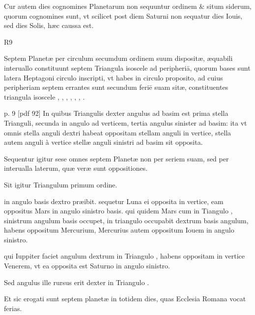 Cur autem dies cognomines Planetarum non sequuntur ordinem \&
situm siderum, quorum cognomines sunt, vt scilicet post diem Saturni
non sequatur dies Iouis, sed dies Solis, hæc caussa est.

\begin{wrapfigure}[9]{R}{9\baselineskip}
  \centering
  \def\svgwidth{9\baselineskip}
  {\astrofont}
\end{wrapfigure}

Septem Planetæ
per circulum secumdum ordinem suum
dispositæ, æquabili interuallo constituunt septem
Triangula isoscele ad peripheriā,  quorum
bases sunt latera Heptagoni circulo inscripti,
vt habes in circulo proposito, ad cuius
peripheriam septem errantes sunt secundum
feriē suam sitæ, constituentes triangula
isoscele , , ,
 , , , .

%

p. 9 [pdf 92]
%
In quibus Triangulis dexter angulus ad basim
est prima stella Trianguli, secunda in angulo ad verticem, tertia angulus
sinister ad basim: ita vt omnis stella anguli dextri habeat oppositam
stellam anguli in vertice, stella autem anguli à vertice stellæ
anguli sinistri ad basim sit opposita.

Sequentur igitur sese omnes septem
Planetæ non per seriem suam, sed per interualla laterum, quæ
veræ sunt oppositiones.

Sit igitur Triangulum  primum ordine.

 in angulo basis dextro præibit. sequetur Luna ei opposita in vertice,
eam oppositus Mars in angulo sinistro basis. qui quidem Mars cum in
Tiangulo , sinistrum angulum basis occupet,
 in triangulo  occupabit
dextrum basis angulum, habens oppositum Mercurium,
Mercurius autem oppositum Iouem in angulo sinistro.

qui Iuppiter
faciet angulum dextrum in Triangulo , habens oppositam in vertice
Venerem, vt ea opposita est Saturno in angulo sinistro.

Sed angulus
ille rursus erit dexter in Triangulo .

Et sic erogati sunt septem
planetæ in totidem dies, quas Ecclesia Romana vocat ferias.

